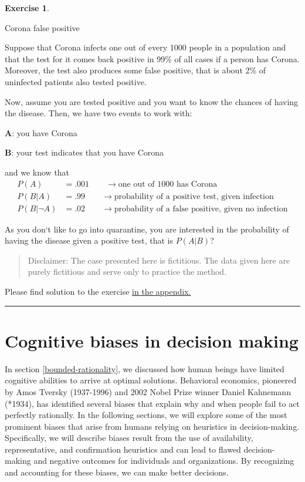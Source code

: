 \documentclass[
  12pt,
  oneside]{book}
\theoremstyle{definition}
\theoremstyle{definition}
\theoremstyle{definition}
\newtheorem{exercise}{Exercise}[chapter]
\theoremstyle{definition}
\theoremstyle{remark}
\begin{document}
\begin{exercise}
\protect\hypertarget{exr:falspos}{}\label{exr:falspos}

Corona false positive

Suppose that Corona infects one out of every 1000 people in a population and that the test for it comes back positive in 99\% of all cases if a person has Corona. Moreover, the test also produces some false positive, that is about 2\% of uninfected patients also tested positive.

Now, assume you are tested positive and you want to know the chances of having the disease.
Then, we have two events to work with:

\textbf{A}: you have Corona

\textbf{B}: your test indicates that you have Corona

and we know that
\begin{align*}
    P(A)&=.001  \qquad \rightarrow \text{one out of 1000 has Corona}\\
    P(B|A)&=.99 \qquad \rightarrow \text{probability of a positive test, given infection}\\
    P(B|\neg A)&=.02 \qquad \rightarrow \text{probability of a false positive, given no infection}
\end{align*}

As you don`t like to go into quarantine, you are interested in the probability of having the disease given a positive test, that is \(P(A|B)\)?

\begin{quote}
Disclaimer: The case presented here is fictitious. The data given here are purely fictitious and serve only to practice the method.
\end{quote}

Please find solution to the exercise \hyperref[sol:falspos]{in the appendix.}

\begin{center}\rule{0.5\linewidth}{0.5pt}\end{center}

\end{exercise}

\section{Cognitive biases in decision making}\label{cognitive-biases}

In section \ref{bounded-rationality}, we discussed how human beings have limited cognitive abilities to arrive at optimal solutions. Behavioral economics, pioneered by Amos Tversky (1937-1996) and 2002 Nobel Prize winner Daniel Kahnemann (*1934), has identified several biases that explain why and when people fail to act perfectly rationally. In the following sections, we will explore some of the most prominent biases that arise from humans relying on heuristics in decision-making. Specifically, we will describe biases result from the use of availability, representative, and confirmation heuristics and can lead to flawed decision-making and negative outcomes for individuals and organizations. By recognizing and accounting for these biases, we can make better decisions.
\end{document}
